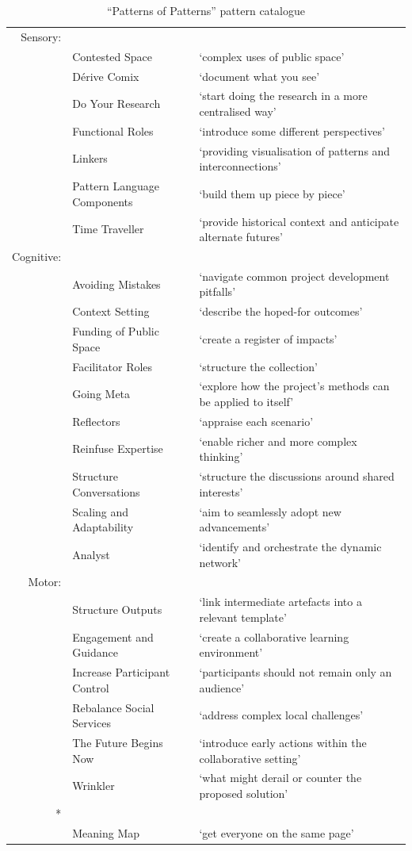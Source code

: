 \documentclass[acmlarge,timestamp]{acmart}
\begin{document}
\begin{table}
  \begin{tabular}{rll}
Sensory: &\\
&  {\sc Contested Space}& ‘complex uses of public space’ \\
&  {\sc Dérive Comix}& ‘document what you see’ \\
&  {\sc Do Your Research}& ‘start doing the research in a more centralised way’\\
&  {\sc Functional Roles}& ‘introduce some
different perspectives’ \\
&  {\sc Linkers}& ‘providing visualisation of patterns and interconnections’ \\
&  {\sc Pattern Language Components }& ‘build them up piece by piece’\\
&  {\sc Time Traveller }& ‘provide historical context and
anticipate alternate futures’\\
Cognitive: && \\
&{\sc Avoiding Mistakes}& ‘navigate common project development pitfalls’\\
&{\sc Context Setting}& ‘describe the hoped-for outcomes’\\
&{\sc Funding of Public Space}& ‘create a register of impacts’\\
&{\sc Facilitator Roles}& ‘structure the collection’\\
&{\sc Going Meta}& ‘explore how the project’s methods can be applied to
itself’\\
&{\sc Reflectors}& ‘appraise each scenario’\\
&{\sc Reinfuse Expertise }& ‘enable richer and more complex thinking’\\
&{\sc Structure Conversations}& ‘structure the discussions around shared interests’\\
&{\sc Scaling and Adaptability}& ‘aim to seamlessly adopt new advancements’\\
&{\sc Analyst }& ‘identify and orchestrate the dynamic network’ \\
Motor: && \\
&{\sc Structure Outputs}& ‘link intermediate artefacts into a relevant template’\\
&{\sc Engagement and Guidance}& ‘create a
collaborative learning environment’\\
&{\sc Increase Participant Control}& ‘participants should not remain only an audience’\\
&{\sc Rebalance Social Services}& ‘address complex local challenges’\\
&{\sc The Future Begins Now}& ‘introduce early actions within the
collaborative setting’\\
&{\sc Wrinkler }& ‘what might derail or counter
the proposed solution’\\
*\phantom{xxx} & \\
&  {\sc Meaning Map }& ‘get everyone on the same
page’\\
  \end{tabular}
  \smallskip
  \caption{“Patterns of Patterns” pattern catalogue\label{summary}}
\end{table}
\end{document}
